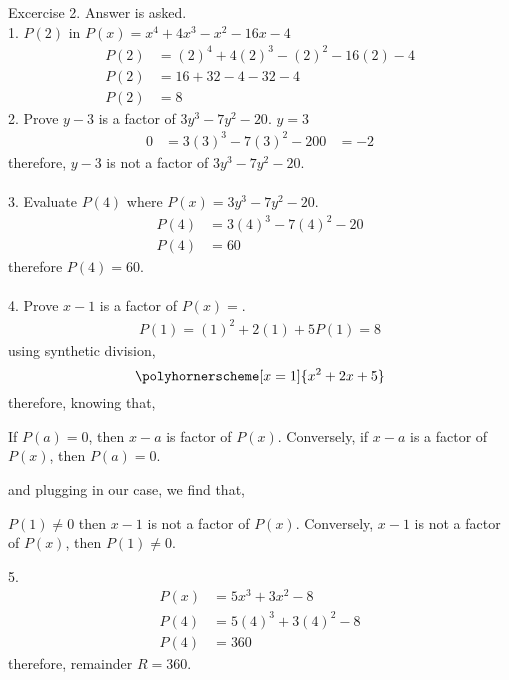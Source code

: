 \documentclass{article}
\begin{document}
    
    Excercise 2. Answer is asked.\\
    1. $P(2)$ in $P(x)=x^4+4x^3-x^2-16x-4$
    \begin{align*}
        P(2)&=(2)^4+4(2)^3-(2)^2-16(2)-4\\
        P(2)&=16+32-4-32-4\\
        P(2)&=8
    \end{align*}
    2. Prove $y-3$ is a factor of $3y^3-7y^2-20$. $y=3$
    \begin{align*}
        0&=3(3)^3-7(3)^2-20
        0&=-2
    \end{align*}
    therefore, $y-3$ is not a factor of $3y^3-7y^2-20$.\\\\
    3. Evaluate $P(4)$ where $P(x)=3y^3-7y^2-20$.
    \begin{align*}
        P(4)&=3(4)^3-7(4)^2-20\\
        P(4)&=60
    \end{align*}
    therefore $P(4)=60$.\\\\
    4. Prove $x-1$ is a factor of $P(x)=$.
    \begin{align*}
        P(1)=(1)^2+2(1)+5
        P(1)=8
    \end{align*}
    using synthetic division,
    \begin{equation}
        \polyhornerscheme[x=1]{x^2+2x+5}
    \end{equation}
    \newpage
    therefore, knowing that,
    \begin{center}
        If $P(a)=0$, then $x-a$ is factor of $P(x)$. Conversely, if $x-a$ is a factor of $P(x)$, then $P(a)=0$.
    \end{center}
    and plugging in our case, we find that,
    \begin{center}
        $P(1)\neq 0$ then $x-1$ is not a factor of $P(x)$. Conversely, $x-1$ is not a factor of $P(x)$, then $P(1)\neq 0$. 
    \end{center}
    5.
    \begin{align*}
        P(x)&=5x^3+3x^2-8\\
        P(4)&=5(4)^3+3(4)^2-8\\
        P(4)&=360
    \end{align*}
    therefore, remainder $R=360$.
\end{document}
